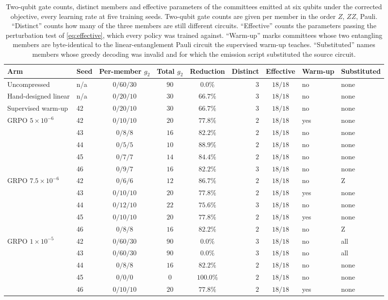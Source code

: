 \begin{table}[t]
\centering
\caption{Two-qubit gate counts, distinct members and effective parameters of the committees
emitted at six qubits under the corrected objective, every learning rate at five training
seeds. Two-qubit gate counts are given per member in the order $Z$, $ZZ$, Pauli. ``Distinct'' counts how many of the three
members are still different circuits. ``Effective'' counts the parameters passing the
perturbation test of \eqref{eq:effective}, which every policy was trained against.
``Warm-up'' marks committees whose two entangling members are byte-identical to the
linear-entanglement Pauli circuit the supervised warm-up teaches. ``Substituted'' names
members whose greedy decoding was invalid and for which the emission script substituted
the source circuit.}
\label{tab:compstructure}
\footnotesize
\setlength{\tabcolsep}{2pt}
\begin{tabular}{@{}llcccrcll@{}}
\toprule
Arm & Seed & Per-member $g_2$ & Total $g_2$ & Reduction & Distinct & Effective & Warm-up & Substituted \\
\midrule
Uncompressed & n/a & $0/60/30$ & $90$ & $0.0\%$ & $3$ & $18/18$ & no & none \\
Hand-designed linear & n/a & $0/20/10$ & $30$ & $66.7\%$ & $3$ & $18/18$ & no & none \\
Supervised warm-up & 42 & $0/20/10$ & $30$ & $66.7\%$ & $3$ & $18/18$ & no & none \\
\midrule
\multirow{5}{*}{GRPO $5\times10^{-6}$}
 & 42 & $0/10/10$ & $20$ & $77.8\%$ & $2$ & $18/18$ & yes & none \\
 & 43 & $0/8/8$ & $16$ & $82.2\%$ & $2$ & $18/18$ & no & none \\
 & 44 & $0/5/5$ & $10$ & $88.9\%$ & $2$ & $18/18$ & no & none \\
 & 45 & $0/7/7$ & $14$ & $84.4\%$ & $2$ & $18/18$ & no & none \\
 & 46 & $0/9/7$ & $16$ & $82.2\%$ & $3$ & $18/18$ & no & none \\
\midrule
\multirow{5}{*}{GRPO $7.5\times10^{-6}$}
 & 42 & $0/6/6$ & $12$ & $86.7\%$ & $2$ & $18/18$ & no & Z \\
 & 43 & $0/10/10$ & $20$ & $77.8\%$ & $2$ & $18/18$ & yes & none \\
 & 44 & $0/12/10$ & $22$ & $75.6\%$ & $3$ & $18/18$ & no & none \\
 & 45 & $0/10/10$ & $20$ & $77.8\%$ & $2$ & $18/18$ & yes & none \\
 & 46 & $0/8/8$ & $16$ & $82.2\%$ & $2$ & $18/18$ & no & Z \\
\midrule
\multirow{5}{*}{GRPO $1\times10^{-5}$}
 & 42 & $0/60/30$ & $90$ & $0.0\%$ & $3$ & $18/18$ & no & all \\
 & 43 & $0/60/30$ & $90$ & $0.0\%$ & $3$ & $18/18$ & no & all \\
 & 44 & $0/8/8$ & $16$ & $82.2\%$ & $2$ & $18/18$ & no & none \\
 & 45 & $0/0/0$ & $0$ & $100.0\%$ & $2$ & $18/18$ & no & none \\
 & 46 & $0/10/10$ & $20$ & $77.8\%$ & $2$ & $18/18$ & yes & none \\
\bottomrule
\end{tabular}
\end{table}
